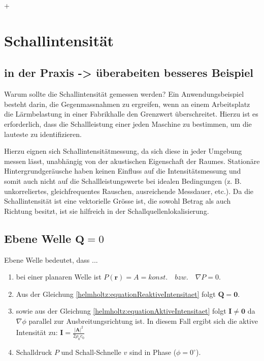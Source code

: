 
+%
%
%
%
\section{Schallintensität
\label{helmholtz:section:teil1}}


\subsection{in der Praxis -> überabeiten besseres Beispiel}

Warum sollte die Schallintensität gemessen werden? Ein Anwendungsbeispiel besteht darin, die Gegenmassnahmen zu ergreifen, wenn an einem Arbeitsplatz die Lärmbelastung in einer Fabrikhalle den Grenzwert überschreitet. Hierzu ist es erforderlich, dass die Schallleistung einer jeden Maschine zu bestimmen, um die lauteste zu identifizieren.  \newline

Hierzu eignen sich Schallintensitätmessung, da sich diese in jeder Umgebung messen lässt, unabhängig von der akustischen Eigenschaft der Raumes. Stationäre Hintergrundgeräusche haben keinen Einfluss auf die Intensitätsmessung und somit auch nicht auf die Schallleistungswerte bei idealen Bedingungen (z. B. unkorreliertes, gleichfrequentes Rauschen, ausreichende Messdauer, etc.). Da die Schallintensität ist eine vektorielle Grösse ist, die sowohl Betrag als auch Richtung besitzt, ist sie hilfreich in der Schallquellenlokalisierung.



\subsection{Ebene Welle $\mathbf{Q} = 0$
\label{helmholtz:subsection:ebeneWelle}}

Ebene Welle bedeutet, dass ...
\begin{enumerate}
\item bei einer planaren Welle ist $P (\mathbf{r}) = A = konst.\quad bzw. \quad \nabla P = 0$.
\item Aus der Gleichung \eqref{helmholtz:equationReaktiveIntensitaet} folgt $\mathbf{Q} = \mathbf{0}$.
\item sowie aus der Gleichung \eqref{helmholtz:equationAktiveIntensitaet} folgt $\mathbf{I} \neq \mathbf{0}$ da $ \nabla \phi$ parallel zur Ausbreitungsrichtung ist. In diesem Fall ergibt sich die aktive Intensität zu: $\mathbf{I} = \frac{|\mathbf{A}|^2}{2 \rho_0 c_0}$
\item Schalldruck $P$ und Schall-Schnelle $v$ sind in Phase ($\phi = 0^{\circ}$).
\end{enumerate}


